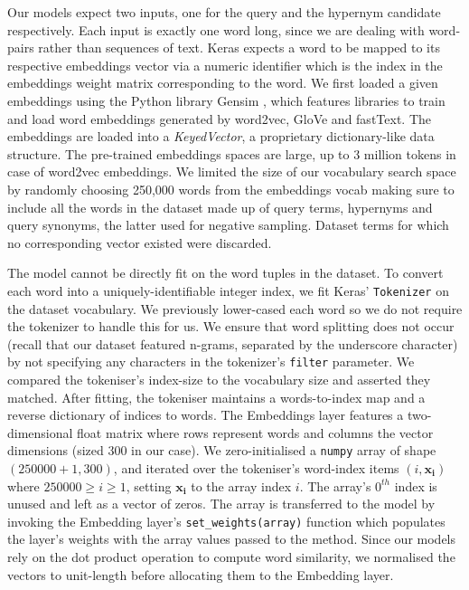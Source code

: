 Our models expect two inputs, one for the query and the hypernym candidate respectively.  Each input is exactly one word long, since we are dealing with word-pairs rather than sequences of text.  Keras expects a word to be mapped to its respective embeddings vector via a numeric identifier which is the index in the embeddings weight matrix corresponding to the word.  We first loaded a given embeddings using the Python library Gensim \citep{rehurek_lrec}, which features libraries to train and load word embeddings generated by word2vec, GloVe and fastText.  The embeddings are loaded into a \textit{KeyedVector}, a proprietary dictionary-like data structure.  The pre-trained embeddings spaces are large, up to 3 million tokens in case of word2vec embeddings.  We limited the size of our vocabulary search space by randomly choosing 250,000 words from the embeddings vocab making sure to include all the words in the dataset made up of query terms, hypernyms and query synonyms, the latter used for negative sampling.  Dataset terms for which no corresponding vector existed were discarded.

The model cannot be directly fit on the word tuples in the dataset.  To convert each word into a uniquely-identifiable integer index, we fit Keras' \texttt{Tokenizer} on the dataset vocabulary.  We previously lower-cased each word so we do not require the tokenizer to handle this for us.  We ensure that word splitting does not occur (recall that our dataset featured n-grams, separated by the underscore character) by not specifying any characters in the tokenizer's \texttt{filter} parameter.
We compared the tokeniser's index-size to the vocabulary size and asserted they matched.  After fitting, the tokeniser maintains a words-to-index map and a reverse dictionary of indices to words.  The Embeddings layer features a two-dimensional float matrix where rows represent words and columns the vector dimensions (sized 300 in our case).  We zero-initialised a \texttt{numpy} array of shape $(250000 + 1, 300)$, and iterated over the tokeniser's word-index items $(i, \bm{x_i})$ where $250000 \geq i \geq 1$, setting $\bm{x_i}$ to the array index $i$.  The array's $0^{th}$ index is unused and left as a vector of zeros.  The array is transferred to the model by invoking the Embedding layer's \texttt{set\_weights(array)} function which populates the layer's weights with the array values passed to the method.  Since our models rely on the dot product operation to compute word similarity, we normalised the vectors to unit-length before allocating them to the Embedding layer.

